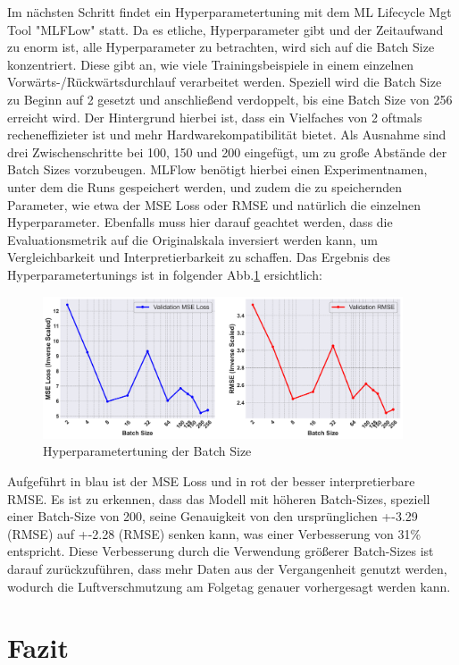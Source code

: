 \documentclass{article}
\begin{document}
Im nächsten Schritt findet ein Hyperparametertuning mit dem ML Lifecycle Mgt Tool "MLFLow" statt.
Da es etliche, Hyperparameter gibt und der Zeitaufwand zu enorm ist, alle Hyperparameter zu betrachten, wird sich auf die Batch Size konzentriert.
Diese gibt an, wie viele Trainingsbeispiele in einem einzelnen Vorwärts-/Rückwärtsdurchlauf verarbeitet werden. 
Speziell wird die Batch Size zu Beginn auf 2 gesetzt und anschließend verdoppelt, bis eine Batch Size von 256 erreicht wird. 
Der Hintergrund hierbei ist, dass ein Vielfaches von 2 oftmals recheneffizieter ist und mehr Hardwarekompatibilität bietet.
Als Ausnahme sind drei Zwischenschritte bei 100, 150 und 200 eingefügt, um zu große Abstände der Batch Sizes vorzubeugen. 
MLFlow benötigt hierbei einen Experimentnamen, unter dem die Runs gespeichert werden, und zudem die zu speichernden Parameter, wie etwa der MSE Loss oder RMSE und natürlich die einzelnen Hyperparameter. 
Ebenfalls muss hier darauf geachtet werden, dass die Evaluationsmetrik auf die Originalskala inversiert werden kann, um Vergleichbarkeit und Interpretierbarkeit zu schaffen.
Das Ergebnis des Hyperparametertunings ist in folgender Abb.\ref{fig:ergebnis_nach} ersichtlich:
\begin{figure}[H]
  \centering
  \includegraphics[width=0.95\textwidth]{Ergebnisse NACH Hyperparametertuning.png}
  \caption{Hyperparametertuning der Batch Size}
  \label{fig:ergebnis_nach}
\end{figure}
Aufgeführt in blau ist der MSE Loss und in rot der besser interpretierbare RMSE. 
Es ist zu erkennen, dass das Modell mit höheren Batch-Sizes, speziell einer Batch-Size von 200, seine Genauigkeit von den ursprünglichen +-3.29 (RMSE) 
auf +-2.28 (RMSE) senken kann, was einer Verbesserung von 31\% entspricht.
Diese Verbesserung durch die Verwendung größerer Batch-Sizes ist darauf zurückzuführen, dass mehr Daten aus der Vergangenheit genutzt werden, wodurch die Luftverschmutzung am Folgetag genauer vorhergesagt werden kann.

\section{Fazit}
\end{document}
